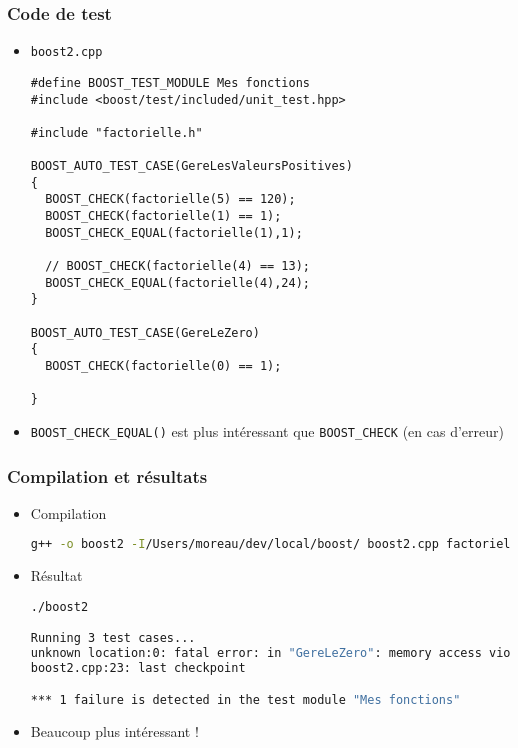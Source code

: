 \begin{frame}[fragile]
\frametitle{Code de test}
\begin{itemize}
\item \texttt{boost2.cpp}
\begin{lstlisting}
#define BOOST_TEST_MODULE Mes fonctions
#include <boost/test/included/unit_test.hpp>

#include "factorielle.h"

BOOST_AUTO_TEST_CASE(GereLesValeursPositives)
{
  BOOST_CHECK(factorielle(5) == 120);
  BOOST_CHECK(factorielle(1) == 1);
  BOOST_CHECK_EQUAL(factorielle(1),1);

  // BOOST_CHECK(factorielle(4) == 13);
  BOOST_CHECK_EQUAL(factorielle(4),24);
}

BOOST_AUTO_TEST_CASE(GereLeZero)
{
  BOOST_CHECK(factorielle(0) == 1);

}
\end{lstlisting}
\item \texttt{BOOST\_CHECK\_EQUAL()} est plus intéressant que \texttt{BOOST\_CHECK} (en cas d'erreur)
\end{itemize}
\end{frame}

\begin{frame}[fragile]
\frametitle{Compilation et résultats}
\begin{itemize}
\item Compilation
\begin{lstlisting}[language=Bash]
g++ -o boost2 -I/Users/moreau/dev/local/boost/ boost2.cpp factorielle.cpp
\end{lstlisting}
\item Résultat
\begin{lstlisting}[language=Bash]
./boost2

Running 3 test cases...
unknown location:0: fatal error: in "GereLeZero": memory access violation at address: 0x7ffeea63cff8: invalid permissions
boost2.cpp:23: last checkpoint

*** 1 failure is detected in the test module "Mes fonctions"
\end{lstlisting}
\pause \item Beaucoup plus intéressant !
\end{itemize}
\end{frame}

